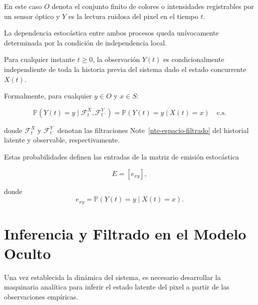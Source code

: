\documentclass[
  spanish,
  us-letterpaper,
  DIV=11,
  numbers=noendperiod]{scrreprt}
\newcounter{quartocalloutnteno}
\newcommand{\quartocalloutnte}[1]{\refstepcounter{quartocalloutnteno}\label{#1}}
\begin{document}
En este caso \(O\) denota el conjunto finito de colores o intensidades
registrables por un sensor óptico y \(Y\) es la lectura ruidosa del
pixel en el tiempo \(t\).

\begin{tcolorbox}[enhanced jigsaw, bottomtitle=1mm, opacityback=0, colback=white, colframe=quarto-callout-note-color-frame, leftrule=.75mm, rightrule=.15mm, breakable, colbacktitle=quarto-callout-note-color!10!white, toprule=.15mm, toptitle=1mm, arc=.35mm, title=\textcolor{quarto-callout-note-color}{\faInfo}\hspace{0.5em}{Nota \ref*{nte-matriz-emision}: Definición (Matriz de Emisión e Independencia Condicional)}, opacitybacktitle=0.6, titlerule=0mm, bottomrule=.15mm, coltitle=black, left=2mm]

\quartocalloutnte{nte-matriz-emision} 

La dependencia estocástica entre ambos procesos queda unívocamente
determinada por la condición de independencia local.

Para cualquier instante \(t\ge0\), la observación \(Y(t)\) es
condicionalmente independiente de toda la historia previa del sistema
dado el estado concurrente \(X(t)\).

Formalmente, para cualquier \(y\in O\) y \(x\in S\):

\[
\mathbb{P}(Y(t)=y \mid \mathcal{F}_t^X,\mathcal{F}_{t^-}^Y)
=
\mathbb{P}(Y(t)=y \mid X(t)=x)
\quad
\text{c.s.}
\]

donde \(\mathcal{F}_t^X\) y \(\mathcal{F}_{t^-}^Y\) denotan las
filtraciones Note~\ref{nte-espacio-filtrado} del historial latente y
observable, respectivamente.

Estas probabilidades definen las entradas de la matriz de emisión
estocástica

\[
E=[e_{xy}],
\]

donde \[
e_{xy}
=
\mathbb{P}(Y(t)=y \mid X(t)=x).
\]

\end{tcolorbox}

\section{Inferencia y Filtrado en el Modelo
Oculto}\label{inferencia-y-filtrado-en-el-modelo-oculto}

Una vez establecida la dinámica del sistema, es necesario desarrollar la
maquinaria analítica para inferir el estado latente del pixel a partir
de las observaciones empíricas.
\end{document}
